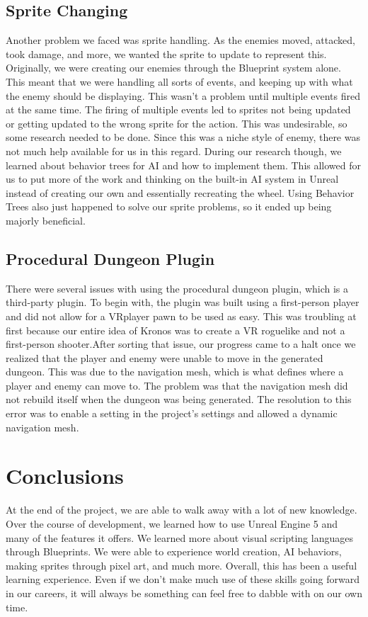 \documentclass{sigchi}
\begin{document}
\subsection*{Sprite Changing}
Another problem we faced was sprite handling. As the enemies moved, attacked, took damage, and more, we wanted the sprite to update to represent this. Originally, we were creating our enemies through the Blueprint system alone. This meant that we were handling all sorts of events, and keeping up with what the enemy should be displaying. This wasn't a problem until multiple events fired at the same time. The firing of multiple events led to sprites not being updated or getting updated to the wrong sprite for the action. This was undesirable, so some research needed to be done. Since this was a niche style of enemy, there was not much help available for us in this regard. During our research though, we learned about behavior trees for AI and how to implement them. This allowed for us to put more of the work and thinking on the built-in AI system in Unreal instead of creating our own and essentially recreating the wheel. Using Behavior Trees also just happened to solve our sprite problems, so it ended up being majorly beneficial.
\subsection*{Procedural Dungeon Plugin}
There were several issues with using the procedural dungeon plugin, which is a third-party plugin. To begin with, the plugin was built using a first-person player and did not allow for a VRplayer pawn to be used as easy. This was troubling at first because our entire idea of Kronos was to create a VR roguelike and not a first-person shooter.After sorting that issue, our progress came to a halt once we realized that the player and enemy were unable to move in the generated dungeon.  This was due to the navigation mesh, which is what defines where a player and enemy can move to. The problem was that the navigation mesh did not rebuild itself when the dungeon was being generated. The resolution to this error was to enable a setting in the project's settings and allowed a dynamic navigation mesh.

\section{Conclusions}
At the end of the project, we are able to walk away with a lot of new knowledge. Over the course of development, we learned how to use Unreal Engine 5 and many of the features it offers. We learned more about visual scripting languages through Blueprints. We were able to experience world creation, AI behaviors, making sprites through pixel art, and much more. Overall, this has been a useful learning experience. Even if we don't make much use of these skills going forward in our careers, it will always be something can feel free to dabble with on our own time.
\end{document}
